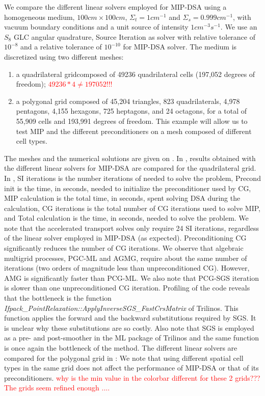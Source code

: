 We compare the different linear solvers employed for MIP-DSA using a homogeneous medium, $100cm
\times 100cm$, $\Sigma_t = 1cm^{-1}$ and $\Sigma_s = 0.999cm^{-1}$, with
vacuum boundary conditions and a unit source of intensity $1cm^{-3}s^{-1}$. We
use an $S_8$ GLC angular quadrature, Source Iteration as solver
with relative tolerance of $10^{-8}$ and a relative tolerance of
$10^{-10}$ for MIP-DSA solver. The medium is discretized using two different meshes:
\begin{enumerate}
  \item a quadrilateral gridcomposed of 49236 quadrilateral
    cells (197,052 degrees of freedom); \textcolor{red}{$49236*4\ne 197052$!!!}
  \item a polygonal grid composed of 45,204 triangles, 823
    quadrilaterals, 4,978 pentagons, 4,155 hexagons, 725 heptagons, and 24
    octagons, for a total of 55,909 cells and 193,991 degrees of freedom. This
    example will allow us to test MIP and the different preconditioners on a
    mesh composed of different cell types.
\end{enumerate}
%
The meshes and the numerical solutions are given on .
In , results obtained with the different linear solvers for MIP-DSA 
are compared for the quadrilateral grid.
In , SI iterations is the number iterations of 
needed to solve the problem, Precond init is the time, in
seconds, needed to initialize the preconditioner used by CG, MIP calculation
is the total time, in seconds, spent solving DSA during the calculation, CG
iterations is the total number of CG iterations used to solve MIP, and Total
calculation is the time, in seconds, needed to solve the problem. 
We note that the accelerated transport solves only require 24 SI iterations, regardless of the linear solver
employed in MIP-DSA (as expected). Preconditioning CG significantly reduces the number of CG iterations.
%
We observe that algebraic multigrid processes, PGC-ML and AGMG, require 
about the same number of iterations (two orders of magnitude less than unpreconditioned CG). 
However, AMG is significantly faster than PCG-ML. We also note that PCG-SGS iteration is 
slower than one unpreconditioned CG iteration. Profiling of the code reveals that the
bottleneck is the function \emph{Ifpack\_PointRelaxation::ApplyInverseSGS\_FastCrsMatrix} 
of Trilinos. This function applies the forward and the backward substitutions required by SGS.
It is unclear why these substitutions are so costly. Also note that SGS is employed as
a pre- and post-smoother in the ML package of Trilinos and the same function
is once again the bottleneck of the method.
%
The different linear solvers are compared for the polygonal grid in :
We note that using different spatial cell types in the same grid does not affect
the performance of MIP-DSA or that of its preconditioners.
%
\textcolor{red}{why is the min value in the colorbar different for these 2 grids??? The grids seem refined enough ....}

